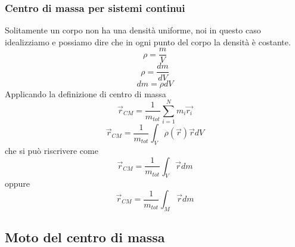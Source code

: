 \documentclass[twoside]{article}
\begin{document}
\subsubsection{Centro di massa per sistemi continui}
Solitamente un corpo non ha una densità uniforme, noi in questo caso idealizziamo e possiamo dire che in ogni punto del corpo la densità è costante.\\
\begin{equation*}
  \rho = \frac{m}{V}
\end{equation*}
\begin{equation*}
  \rho = \frac{dm}{dV}
\end{equation*}
\begin{equation*}
  dm = \rho dV
\end{equation*}
Applicando la definizione di centro di massa
\begin{equation*}
  \vec{r}_{CM} = \frac{1}{m_{tot}} \sum_{i=1}^{N} m_i \vec{r_i}
\end{equation*}
\begin{equation*}
  \vec{r}_{CM} = \frac{1}{m_{tot}} \int_{V} \rho(\vec{r}) \vec{r} dV
\end{equation*}
che si può riscrivere come
\begin{equation}
  \boxed{\vec{r}_{CM} = \frac{1}{m_{tot}} \int_{V} \vec{r} dm}
\end{equation}
oppure
\begin{equation}
  \boxed{\vec{r}_{CM} = \frac{1}{m_{tot}} \int_{M} \vec{r} dm}
\end{equation}
\subsection{Moto del centro di massa}
\end{document}
